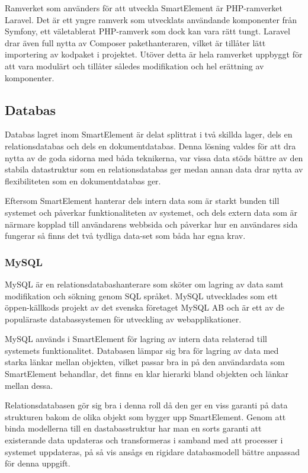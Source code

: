 Ramverket som använders för att utveckla SmartElement är PHP-ramverket Laravel. Det är ett yngre ramverk som utvecklats användande komponenter från Symfony, ett väletablerat PHP-ramverk som dock kan vara rätt tungt. Laravel drar även full nytta av Composer pakethanteraren, vilket är tillåter lätt importering av kodpaket i projektet. Utöver detta är hela ramverket uppbyggt för att vara modulärt och tillåter således modifikation och hel erättning av komponenter.

\subsection{Databas}

Databas lagret inom SmartElement är delat splittrat i två skillda lager, dels en relationsdatabas och dels en dokumentdatabas. Denna lösning valdes för att dra nytta av de goda sidorna med båda teknikerna, var vissa data stöds bättre av den stabila datastruktur som en relationsdatabas ger medan annan data drar nytta av flexibiliteten som en dokumentdatabas ger.

Eftersom SmartElement hanterar dels intern data som är starkt bunden till systemet och påverkar funktionaliteten av systemet, och dels extern data som är närmare kopplad till användarens webbsida och påverkar hur en användares sida fungerar så finns det två tydliga data-set som båda har egna krav.

\subsubsection{MySQL}

MySQL är en relationsdatabashanterare som sköter om lagring av data samt modifikation och sökning genom SQL språket. MySQL utvecklades som ett öppen-källkods projekt av det svenska företaget MySQL AB och är ett av de populäraste databassystemen för utveckling av webapplikationer. \citep{dbengines}

MySQL används i SmartElement för lagring av intern data relaterad till systemets funktionalitet. Databasen lämpar sig bra för lagring av data med starka länkar mellan objekten, vilket passar bra in på den användardata som SmartElement behandlar, det finns en klar hierarki bland objekten och länkar mellan dessa.

Relationsdatabasen gör sig bra i denna roll då den ger en viss garanti på data strukturen bakom de olika objekt som bygger upp SmartElement. Genom att binda modellerna till en dastabasstruktur har man en sorts garanti att existerande data updateras och transformeras i samband med att processer i systemet uppdateras, på så vis ansågs en rigidare databasmodell bättre anpassad för denna uppgift.


